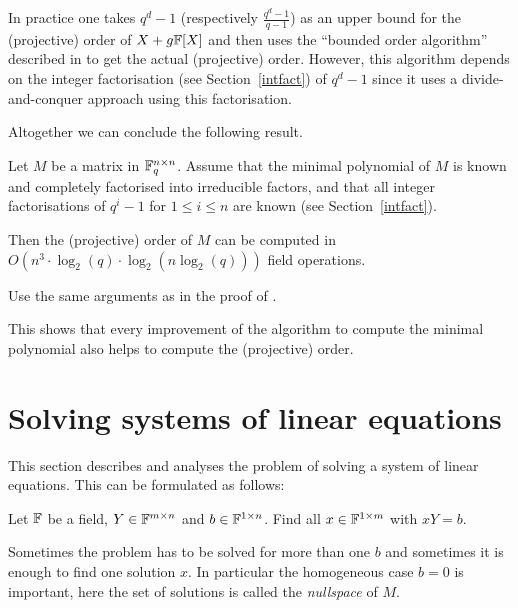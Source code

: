 In practice one takes $q^d-1$ (respectively $\frac{q^d-1}{q-1}$) 
as an upper bound
for the (projective) order of $X+g\mathbb{F}[X]$ and then uses the ``bounded order
algorithm'' described in \cite[Section 2]{CellLeedOrder} to get the
actual (projective) order. However, this algorithm depends on the
integer factorisation (see Section~\ref{intfact}) 
of $q^d-1$ since it uses a divide-and-conquer
approach using this factorisation.

Altogether we can conclude the following result.

\begin{Prop}
%
Let $M$ be a matrix in\/ $\mathbb{F}_q^{n \times n}$. Assume that the 
minimal polynomial of $M$ is known and completely factorised into
%
irreducible factors, and that all integer factorisations of $q^i-1$
for $1 \le i \le n$ are known (see Section~\ref{intfact}). 

Then the (projective) order of $M$ can be
computed in $O(n^3 \cdot \log_2(q) \cdot \log_2(n\log_2(q)))$
field operations.
\end{Prop}
\proofbeg Use the same arguments as in the proof of 
\cite[\textsc{Order Algorithm}]{CellLeedOrder}. 
\proofend

\begin{Rem}
This shows that every improvement of the algorithm to compute the
minimal polynomial also helps to compute the (projective) order.
%
\end{Rem}

\section{Solving systems of linear equations}
\label{sec:syslineq}
%

This section describes and analyses the problem of solving a system
of linear equations. This can be formulated as follows:

Let $\mathbb{F}$ be a field, $Y \in \mathbb{F}^{m \times n}$ and $b \in \mathbb{F}^{1 \times n}$.
Find all $x \in \mathbb{F}^{1 \times m}$ with $xY = b$.

Sometimes the problem has to be solved for more than one $b$ and sometimes
it is enough to find one solution $x$. In particular the homogeneous case 
$b=0$ is important, here the set of solutions is called the \emph{nullspace}
of $M$.
%

